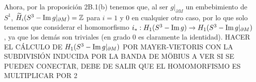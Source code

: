 \documentclass[twoside]{article}
\begin{document}
\begin{solucion}
\begin{enumerate}[(a)]
Ahora, por la proposición 2B.1(b) tenemos que, al ser $g|_{\partial M}$ un embebimiento de $S^1$, $\widetilde{H}_i(S^3-\operatorname{Im} g|_{\partial M})=\mathbb{Z}$ para $i=1$ y 0 en cualquier otro caso, por lo que solo tenemos que considerar el homomorfismo $i_*:H_1(S^3-\operatorname{Im} g)\to H_1(S^3-\operatorname{Im} g|_{\partial M})$, ya que los demás son triviales (en grado 0 es claramente la identidad). HACER EL CÁLCULO DE $H_1(S^3-\operatorname{Im} g|_{\partial M})$ POR MAYER-VIETORIS CON LA SUBDIVISIÓN INDUCIDA POR LA BANDA DE MÖBIUS A VER SI SE PUEDEN CONECTAR, DEBE DE SALIR QUE EL HOMOMORFISMO ES MULTIPLICAR POR 2
%
%

\end{enumerate}
\end{solucion}
\end{document}
